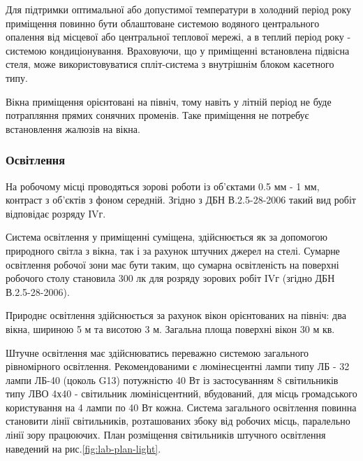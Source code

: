     Для підтримки оптимальної або допустимої температури в холодний період року приміщення повинно бути облаштоване системою водяного центрального опалення від місцевої або центральної теплової мережі, а в теплий період року - системою кондиціонування. Враховуючи, що у приміщенні встановлена підвісна стеля, може використовуватися спліт-система з внутрішнім блоком касетного типу.

    Вікна приміщення орієнтовані на північ, тому навіть у літній період не буде потрапляння прямих сонячних променів. Таке приміщення не потребує встановлення жалюзів на вікна.

    \subsubsection{Освітлення}

    На робочому місці проводяться зорові роботи із об'єктами 0.5 мм - 1 мм, контраст з об'єктів з фоном середній. Згідно з ДБН В.2.5-28-2006\cite{lab-dbn28} такий вид робіт відповідає розряду ІVг.

    Система освітлення у приміщенні суміщена, здійснюється як за допомогою природного світла з вікна, так і за рахунок штучних джерел на стелі. Сумарне освітлення робочої зони має бути таким, що сумарна освітленість на поверхні робочого столу становила 300 лк для розряду зорових робіт IVг (згідно ДБН В.2.5-28-2006\cite{lab-dbn28}).

    Природнє освітлення здійснюється за рахунок вікон орієнтованих на північ: два вікна, шириною 5 м та висотою 3 м. Загальна площа поверхні вікон 30 м кв.

    Штучне освітлення має здійснюватись переважно системою загального рівномірного освітлення. Рекомендованими є люмінесцентні лампи типу ЛБ - 32 лампи ЛБ-40 (цоколь G13) потужністю 40 Вт із застосуванням 8 світильників типу ЛВО 4х40 - світильник люмінісцентний, вбудований, для місць громадського користування на 4 лампи по 40 Вт кожна.
    Система загального освітлення повинна становити лінії світильників, розташованих збоку від робочих місць, паралельно лінії зору працюючих. План розміщення світильників штучного освітлення наведений на рис.\ref{fig:lab-plan-light}.

